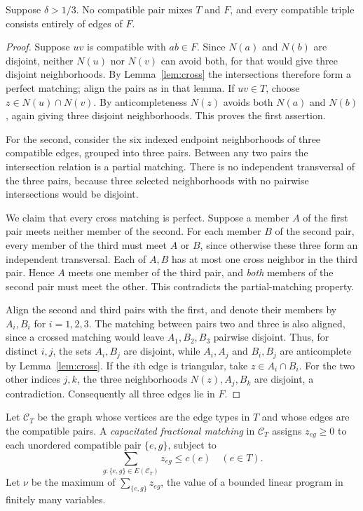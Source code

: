 \begin{lemma}\label{lem:sectors}
Suppose $\delta>1/3$. No compatible pair mixes $T$ and $F$, and every compatible triple consists entirely of edges of $F$.
\end{lemma}
\begin{proof}
Suppose $uv$ is compatible with $ab\in F$. Since $N(a)$ and $N(b)$ are disjoint, neither $N(u)$ nor $N(v)$ can avoid both, for that would give three disjoint neighborhoods. By Lemma~\ref{lem:cross} the intersections therefore form a perfect matching; align the pairs as in that lemma. If $uv\in T$, choose $z\in N(u)\cap N(v)$. By anticompleteness $N(z)$ avoids both $N(a)$ and $N(b)$, again giving three disjoint neighborhoods. This proves the first assertion.

For the second, consider the six indexed endpoint neighborhoods of three compatible edges, grouped into three pairs. Between any two pairs the intersection relation is a partial matching. There is no independent transversal of the three pairs, because three selected neighborhoods with no pairwise intersections would be disjoint.

We claim that every cross matching is perfect. Suppose a member $A$ of the first pair meets neither member of the second. For each member $B$ of the second pair, every member of the third must meet $A$ or $B$, since otherwise these three form an independent transversal. Each of $A,B$ has at most one cross neighbor in the third pair. Hence $A$ meets one member of the third pair, and \emph{both} members of the second pair must meet the other. This contradicts the partial-matching property.

Align the second and third pairs with the first, and denote their members by $A_i,B_i$ for $i=1,2,3$. The matching between pairs two and three is also aligned, since a crossed matching would leave $A_1,B_2,B_3$ pairwise disjoint. Thus, for distinct $i,j$, the sets $A_i,B_j$ are disjoint, while $A_i,A_j$ and $B_i,B_j$ are anticomplete by Lemma~\ref{lem:cross}. If the $i$th edge is triangular, take $z\in A_i\cap B_i$. For the two other indices $j,k$, the three neighborhoods $N(z),A_j,B_k$ are disjoint, a contradiction. Consequently all three edges lie in $F$.
\end{proof}

Let $\mathcal C_T$ be the graph whose vertices are the edge types in $T$ and whose edges are the compatible pairs. A \emph{capacitated fractional matching} in $\mathcal C_T$ assigns $z_{eg}\ge0$ to each unordered compatible pair $\{e,g\}$, subject to
\[
 \sum_{g:\{e,g\}\in E(\mathcal C_T)}z_{eg}\le c(e)\quad(e\in T).
\]
Let $\nu$ be the maximum of $\sum_{\{e,g\}}z_{eg}$, the value of a bounded linear program in finitely many variables.


